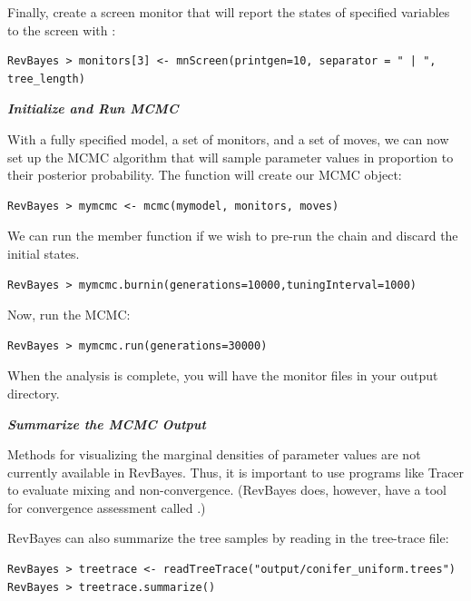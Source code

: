 Finally, create a screen monitor that will report the states of specified variables to the screen with :
{\tt \begin{snugshade*}
\begin{lstlisting}
RevBayes > monitors[3] <- mnScreen(printgen=10, separator = " | ", tree_length)
\end{lstlisting}
\end{snugshade*}}

\textbf{\textit{Initialize and Run MCMC}}

With a fully specified model, a set of monitors, and a set of moves, we can now set up the MCMC algorithm that will sample parameter values in proportion to their posterior probability. The  function will create our MCMC object:
{\tt \begin{snugshade*}
\begin{lstlisting}
RevBayes > mymcmc <- mcmc(mymodel, monitors, moves)
\end{lstlisting}
\end{snugshade*}}


We can run the  member function if we wish to pre-run the chain and discard the initial states. 
{\tt \begin{snugshade*}
\begin{lstlisting}
RevBayes > mymcmc.burnin(generations=10000,tuningInterval=1000)
\end{lstlisting}
\end{snugshade*}}


Now, run the MCMC:
{\tt \begin{snugshade*}
\begin{lstlisting}
RevBayes > mymcmc.run(generations=30000)
\end{lstlisting}
\end{snugshade*}}

When the analysis is complete, you will have the monitor files in your output directory.


\textbf{\textit{Summarize the MCMC Output}}

Methods for visualizing the marginal densities of parameter values are not currently available in RevBayes. Thus, it is important to use programs like Tracer \citep{rambaut09} to evaluate mixing and non-convergence. (RevBayes does, however, have a tool for convergence assessment called .)

RevBayes can also summarize the tree samples by reading in the tree-trace file:
{\tt \begin{snugshade*}
\begin{lstlisting}
RevBayes > treetrace <- readTreeTrace("output/conifer_uniform.trees")
RevBayes > treetrace.summarize()
\end{lstlisting}
\end{snugshade*}}


